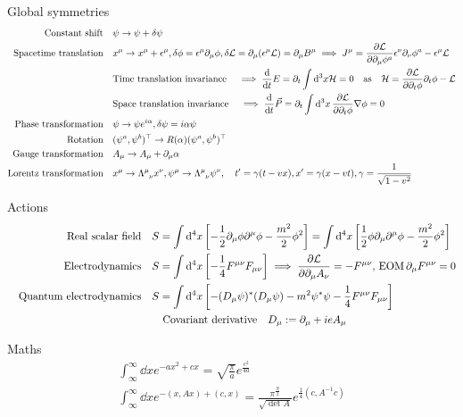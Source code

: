 \documentclass[main]{subfiles}
\begin{document}
Global symmetries
\begin{align}
    \text{Constant shift}& \quad \psi \ra \psi + \delta \psi\\
    \text{Spacetime translation}& \quad x^{\mu} \ra x^{\mu} + \epsilon^{\mu}, \delta \phi = \epsilon^{\mu}\partial_\mu\phi, \delta\La = \partial_\mu(\epsilon^{\mu}\La) = \partial_\mu B^{\mu} \implies J^\mu = \pdv{\La}{\partial_{\mu}\phi^{a}}\epsilon^{\nu}\partial_{\nu}\phi^a - \epsilon^{\mu}\La\\
    & \qq{Time translation invariance} \implies \dv{}{t}E = \partial_t\int\dd[3]x\mathcal{H} = 0 \qas \mathcal{H} = \pdv{\mathcal{L}}{\partial_t\phi}\partial_t\phi - \mathcal{L}\\
    & \qq{Space translation invariance} \implies \dv{}{t}\vec P = \partial_t\int \dd[3]{x} \pdv{\mathcal{L}}{\partial_t\phi}\nabla\phi = 0\\
    \text{Phase transformation}& \quad \psi \ra \psi e^{i\alpha}, \delta\psi = i\alpha\psi\\
    \text{Rotation}& \quad (\psi^a, \psi^b)^\top \ra R(\alpha)(\psi^a, \psi^b)^\top\\
    \text{Gauge transformation}& \quad A_\mu \ra A_\mu + \partial_\mu \alpha\\
    \text{Lorentz transformation}& \quad x^\mu \ra \Lambda\indices{^\mu_\nu} x^\nu, \psi^\mu \ra \Lambda\indices{^\mu_\nu} \psi^\nu, \quad t'=\gamma(t-vx), x' = \gamma(x-vt), \gamma=\frac{ 1}{\sqrt{1-v^2}}
\end{align}

Actions
\begin{align}
    \qq{Real scalar field} &
    S = \int\dd[4]{x} \qty[-\frac{ 1}{2}\partial_\mu\phi\partial^{\mu}\phi - \frac{m^2}{2}\phi^2] = \int\dd[4]{x} \qty[\frac{ 1}{2}\phi\partial_\mu\partial^{\mu}\phi - \frac{m^2}{2}\phi^2]\label{eq:real-scalar-field}\\
    \qq{Electrodynamics} &
    S = \int\dd[4]{x} \qty[-\frac{1}{4}F^{\mu\nu}F_{\mu\nu}] \implies \pdv{\La}{\partial_\mu A_\nu} = -F^{\mu\nu},\,\text{EOM}\, \partial_\mu F^{\mu\nu} = 0\\
    \qq{Quantum electrodynamics} &
    S = \int\dd[4]{x} \qty[-(D_{\mu }\psi )^*(D_{\mu }\psi ) - m^2 \psi ^*\psi - \frac{1}{4}F^{\mu \nu }F_{\mu \nu }]\\
    & \qq{Covariant derivative} D_{\mu } := \partial_{\mu } + ieA_{\mu }
\end{align}

Maths
\begin{gather}
\int^\infty_\infty\dd{x}e^{-ax^{2}+cx} = \sqrt{\frac{\pi}{a}}e^{\frac{c^2}{4a}}\\
\int^\infty_\infty\dd{x}e^{-(x,Ax)+(c,x)} = \frac{\pi^{\frac{N}{2}}}{\sqrt{\det A}} e^{\frac{1}{4}(c,A^{-1}c)}
\end{gather}
\end{document}
